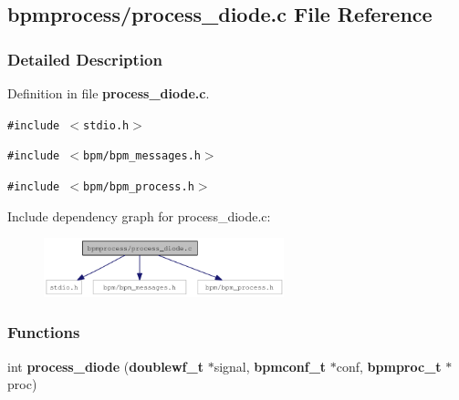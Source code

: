 \subsection{bpmprocess/process\_\-diode.c File Reference}
\label{process__diode_8c}


\subsubsection{Detailed Description}


Definition in file {\bf process\_\-diode.c}.

{\tt \#include $<$stdio.h$>$}\par
{\tt \#include $<$bpm/bpm\_\-messages.h$>$}\par
{\tt \#include $<$bpm/bpm\_\-process.h$>$}\par


Include dependency graph for process\_\-diode.c:\nopagebreak
\begin{figure}[H]
\begin{center}
\leavevmode
\includegraphics[width=197pt]{process__diode_8c__incl}
\end{center}
\end{figure}
\subsubsection*{Functions}
\begin{CompactItemize}
\item 
int {\bf process\_\-diode} ({\bf doublewf\_\-t} $\ast$signal, {\bf bpmconf\_\-t} $\ast$conf, {\bf bpmproc\_\-t} $\ast$proc)
\end{CompactItemize}

